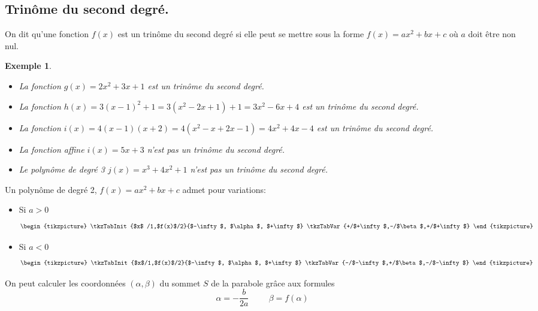 \documentclass[a4paper,11pt]{article}
\theoremstyle{break}
\newtheorem{Ex}{Exemple}
\begin{document}
  \subsection{Trinôme du second degré.}
  
  \begin{Def}
   On dit qu'une fonction $f(x)$ est un trinôme du second degré si elle peut se mettre
   sous la forme $f(x)=ax^2+bx+c$ où $a$ doit être non nul.
  \end{Def}
  
  \begin{Ex}
    \begin{itemize}
     \item La fonction $g(x)=2x^2+3x+1$ est un trinôme du second degré.
     \item La fonction $h(x)=3(x-1)^2+1=3(x^2-2x+1)+1=3x^2-6x+4$ est un trinôme 
     du second degré.
     \item La fonction $i(x)=4(x-1)(x+2)=4(x^2-x+2x-1)=4x^2+4x-4$ est un trinôme
     du second degré.
     \item La fonction affine $i(x)=5x+3$ n'est pas un trinôme du second degré.
     \item Le polynôme de degré 3 $j(x)=x^3+4x^2+1$ n'est pas un trinôme du second degré.
 \end{itemize} 
 \end{Ex}

  
  \newpage
  
  
  
  \begin{Theo}
    Un polynôme de degré 2, $f(x)=ax^2+bx+c$ admet pour variations:
    \begin{itemize}
      \item Si $a>0$
      \[
      \begin{tikzpicture}
	\tkzTabInit{$x$ /1,$f(x)$/2}{$-\infty$, $\alpha$, $+\infty$}
	
	\tkzTabVar{+/$+\infty$,-/$\beta$,+/$+\infty$}
      \end{tikzpicture}
      \] 
      
      \item Si $a<0$
      \[
      \begin{tikzpicture}
	\tkzTabInit{$x$/1,$f(x)$/2}{$-\infty$, $\alpha$, $+\infty$}
	
	\tkzTabVar{-/$-\infty$,+/$\beta$,-/$-\infty$}
      \end{tikzpicture}
      \]
    \end{itemize}
    
    On peut calculer les coordonnées $(\alpha,\beta)$ du sommet $S$ de la parabole grâce aux formules 
    $$\alpha=-\frac{b}{2a} \hspace{1cm} \beta=f(\alpha)$$
    
    \end{Theo}
    
\end{document}
